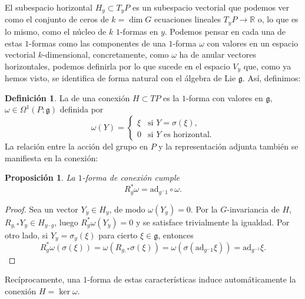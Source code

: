 \documentclass[12pt,a4paper]{article}
\newtheorem{prop}[thm]{Proposición}
\theoremstyle{definition} \newtheorem{defn}[thm]{Definición}
\theoremstyle{definition} \newtheorem{ejemplo}[thm]{Ejemplo}
\theoremstyle{definition} \newtheorem{ejercicio}[thm]{Ejercicio}
\theoremstyle{remark} \newtheorem*{obs}{Observación}
\def\gg{\mathfrak{g}}
\def\ad{\mathrm{ad}}
\def\RR{\mathbb{R}}
\let\emph\relax
\begin{document}
	El subespacio horizontal $H_y\subset T_yP$ es un subespacio vectorial que podemos ver como el conjunto de ceros de $k=\dim G$ ecuaciones lineales $T_yP \rightarrow \RR$ o, lo que es lo mismo, como el núcleo de $k$ $1$-formas en $y$. Podemos pensar en cada una de estas $1$-formas como las componentes de una $1$-forma $\omega$ con valores en un espacio vectorial $k$-dimensional, concretamente, como $\omega$ ha de anular vectores horizontales, podemos definirla por lo que sucede en el espacio $V_y$ que, como ya hemos visto, se identifica de forma natural con el álgebra de Lie $\gg$. Así, definimos:
	\begin{defn}
	  La \emph{$1$-forma de conexión} de una conexión $H\subset TP$ es la $1$-forma con valores en $\gg$, $\omega\in \Omega^1(P;\gg)$ definida por
	  \begin{equation*}
	    \omega(Y)=
	    \begin{cases}
	      \xi & \text{si } Y=\sigma(\xi), \\
	      0 & \text{si } Y \text{ es horizontal.}
	    \end{cases}
	  \end{equation*}
	  La relación entre la acción del grupo en $P$ y la representación adjunta también se manifiesta en la conexión:
	  \begin{prop}
	    La $1$-forma de conexión cumple
	    \begin{equation*}
	      R^*_g\omega=\ad_{g^-1}\circ \omega.
	    \end{equation*}
	  \end{prop}
	  \begin{proof}
	    Sea un vector $Y_y\in H_y$, de modo $\omega(Y_y)=0$. Por la $G$-invariancia de $H$, $R_{g,*}Y_y\in H_{y\cdot g}$, luego $R_g^* \omega(Y_y)=0$ y se satisface trivialmente la igualdad. Por otro lado, si $Y_y=\sigma_y(\xi)$ para cierto $\xi \in \gg$, entonces
	    \begin{equation*}
	      R_g^*\omega(\sigma(\xi))=\omega(R_{g,*}\sigma(\xi))=\omega(\sigma(\ad_{g^-1}\xi))=\ad_{g^{-1}}\xi.
	    \end{equation*}
	  \end{proof}
	\end{defn}
	Recíprocamente, una $1$-forma de estas características induce automáticamente la conexión $H=\ker \omega$.
\end{document}
